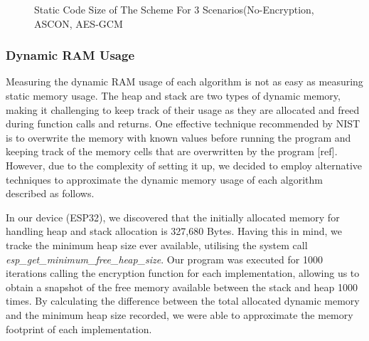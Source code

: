 \begin{figure}[H]
    \centering
    \caption{Static Code Size of The Scheme For 3 Scenarios(No-Encryption, ASCON, AES-GCM}
\label{Fig:codesize}
\end{figure}

\subsubsection{Dynamic RAM Usage}


Measuring the dynamic RAM usage of each algorithm is not as easy as measuring static memory usage. The heap and stack are two types of dynamic memory, making it challenging to keep track of their usage as they are allocated and freed during function calls and returns. One effective technique recommended by NIST is to overwrite the memory with known values before running the program and keeping track of the memory cells that are overwritten by the program [ref]. However, due to the complexity of setting it up,  we decided to employ alternative techniques to approximate the dynamic memory usage of each algorithm described as follows.



In our device (ESP32), we discovered that the initially allocated memory for handling heap and stack allocation is 327,680 Bytes. Having this in mind, we tracke the minimum heap size ever available, utilising the system call \textit{esp\_get\_minimum\_free\_heap\_size}. Our program was executed for 1000 iterations calling the encryption function for each implementation, allowing us to obtain a snapshot of the free memory available between the stack and heap 1000 times. By calculating the difference between the total allocated dynamic memory and the minimum heap size recorded, we were able to approximate the memory footprint of each implementation.

